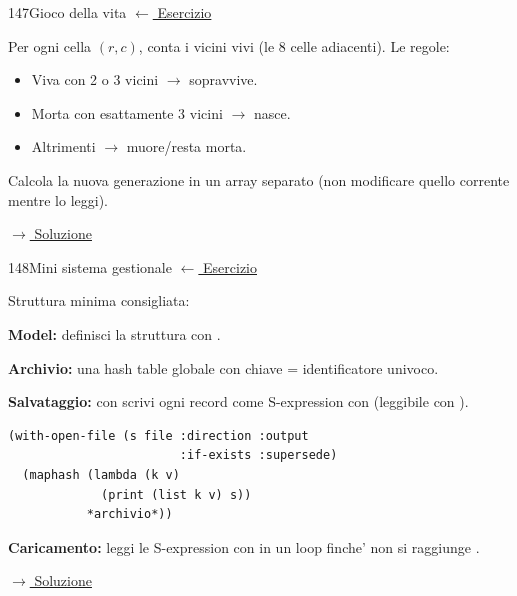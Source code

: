 \label{hint:147}
\begin{hintbox}{147}{Gioco della vita}
\small\color{black!55}\hyperref[ex:147]{$\leftarrow$ Esercizio}\normalsize\color{black}

Per ogni cella $(r, c)$, conta i vicini vivi (le 8 celle adiacenti).
Le regole:
\begin{itemize}[leftmargin=2em]
  \item Viva con 2 o 3 vicini $\to$ sopravvive.
  \item Morta con esattamente 3 vicini $\to$ nasce.
  \item Altrimenti $\to$ muore/resta morta.
\end{itemize}
Calcola la nuova generazione in un array separato (non
modificare quello corrente mentre lo leggi).

\small\color{black!55}\hyperref[sol:147]{$\rightarrow$ Soluzione}\normalsize\color{black}
\end{hintbox}

\label{hint:148}
\begin{hintbox}{148}{Mini sistema gestionale}
\small\color{black!55}\hyperref[ex:148]{$\leftarrow$ Esercizio}\normalsize\color{black}

Struttura minima consigliata:

\textbf{Model:} definisci la struttura con .

\textbf{Archivio:} una hash table globale 
con chiave = identificatore univoco.

\textbf{Salvataggio:} con  scrivi ogni
record come S-expression con  (leggibile con ).
\begin{lstlisting}
(with-open-file (s file :direction :output
                        :if-exists :supersede)
  (maphash (lambda (k v)
             (print (list k v) s))
           *archivio*))
\end{lstlisting}

\textbf{Caricamento:} leggi le S-expression con 
in un loop finche' non si raggiunge .

\small\color{black!55}\hyperref[sol:148]{$\rightarrow$ Soluzione}\normalsize\color{black}
\end{hintbox}

